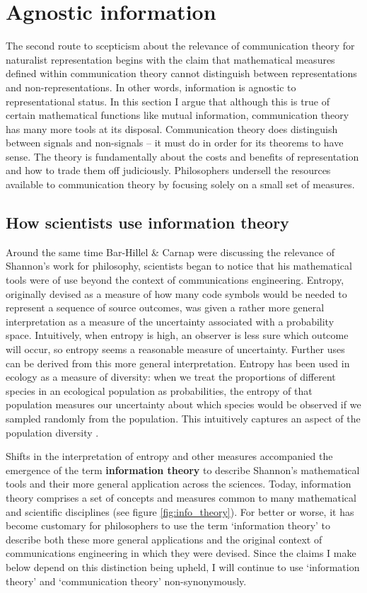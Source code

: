 \section{Agnostic information}\label{sec:agnostic}

The second route to scepticism about the relevance of communication theory for naturalist representation begins with the claim that mathematical measures defined within communication theory cannot distinguish between representations and non-representations.
In other words, information is agnostic to representational status.
In this section I argue that although this is true of certain mathematical functions like mutual information, communication theory has many more tools at its disposal.
Communication theory does distinguish between signals and non-signals -- it must do in order for its theorems to have sense.
The theory is fundamentally about the costs and benefits of representation and how to trade them off judiciously.
Philosophers undersell the resources available to communication theory by focusing solely on a small set of measures.

\subsection{How scientists use information theory}\label{subsec:scientists}

Around the same time Bar-Hillel \& Carnap were discussing the relevance of Shannon's work for philosophy, scientists began to notice that his mathematical tools were of use beyond the context of communications engineering.
Entropy, originally devised as a measure of how many code symbols would be needed to represent a sequence of source outcomes, was given a rather more general interpretation as a measure of the uncertainty associated with a probability space.
Intuitively, when entropy is high, an observer is less sure which outcome will occur, so entropy seems a reasonable measure of uncertainty.
Further uses can be derived from this more general interpretation.
Entropy has been used in ecology as a measure of diversity: when we treat the proportions of different species in an ecological population as probabilities, the entropy of that population measures our uncertainty about which species would be observed if we sampled randomly from the population.
This intuitively captures an aspect of the population diversity \citep{margalef1957information}.

Shifts in the interpretation of entropy and other measures accompanied the emergence of the term \textbf{information theory} to describe Shannon's mathematical tools and their more general application across the sciences.
Today, information theory comprises a set of concepts and measures common to many mathematical and scientific disciplines (see figure \ref{fig:info_theory}).
For better or worse, it has become customary for philosophers to use the term `information theory' to describe both these more general applications and the original context of communications engineering in which they were devised.
Since the claims I make below depend on this distinction being upheld, I will continue to use `information theory' and `communication theory' non-synonymously.

